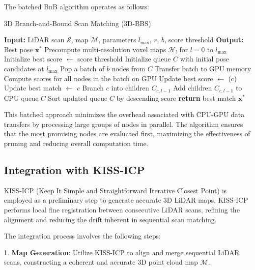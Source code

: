 The batched BnB algorithm operates as follows:

\begin{algorithm}[h]
\caption{3D Branch-and-Bound Scan Matching (3D-BBS)}
\label{alg:3dbbs}
\begin{algorithmic}[1]
\STATE \textbf{Input:} LiDAR scan $\mathcal{S}$, map $\mathcal{M}$, parameters $l_{\text{max}}$, $r$, $b$, score threshold
\STATE \textbf{Output:} Best pose $\mathbf{x}^*$
\STATE Precompute multi-resolution voxel maps $\mathcal{H}_l$ for $l = 0$ to $l_{\text{max}}$
\STATE Initialize best score $\leftarrow$ score threshold
\STATE Initialize queue $C$ with initial pose candidates at $l_{\text{max}}$
    \STATE Pop a batch of $b$ nodes from $C$
    \STATE Transfer batch to GPU memory
    \STATE Compute scores for all nodes in the batch on GPU
                \STATE Update best score $\leftarrow$ (c)
                \STATE Update best match $\leftarrow$ $c$
            \ELSE
                \STATE Branch $c$ into children $C_{c,l-1}$
                \STATE Add children $C_{c,l-1}$ to CPU queue $C$
            \ENDIF
        \ENDIF
    \ENDFOR
    \STATE Sort updated queue $C$ by descending score
\ENDWHILE
\STATE \textbf{return} best match $\mathbf{x}^*$
\end{algorithmic}
\end{algorithm}

This batched approach minimizes the overhead associated with CPU-GPU data transfers by processing large groups of nodes in parallel. The algorithm ensures that the most promising nodes are evaluated first, maximizing the effectiveness of pruning and reducing overall computation time.

\subsection{Integration with KISS-ICP}
KISS-ICP (Keep It Simple and Straightforward Iterative Closest Point) is employed as a preliminary step to generate accurate 3D LiDAR maps. KISS-ICP performs local fine registration between consecutive LiDAR scans, refining the alignment and reducing the drift inherent in sequential scan matching.

The integration process involves the following steps:

1. \textbf{Map Generation}: Utilize KISS-ICP to align and merge sequential LiDAR scans, constructing a coherent and accurate 3D point cloud map $\mathcal{M}$.

